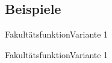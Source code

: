 \subsection{Beispiele}
\begin{frame}{Fakultätsfunktion}{Variante 1}
\end{frame}
\begin{frame}{Fakultätsfunktion}{Variante 1}
\end{frame}

